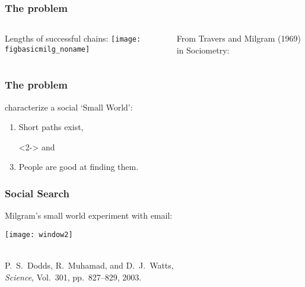 \begin{frame}
   \frametitle{The problem}

   \begin{columns}
     \begin{block}{Lengths of successful chains:}
       \texttt{[image: figbasicmilg\_noname]}
     \end{block}
     From Travers and Milgram (1969) in Sociometry:\cite{travers1969a}\\
   \end{columns}

\end{frame}

\begin{frame}
  \frametitle{The problem}

  \begin{block}{
      characterize a social `Small World':}
    \begin{enumerate}
    \item<2-> Short paths exist, 
    \item[]<2-> and 
    \item<3-> People are good at finding them. 
    \end{enumerate}
  \end{block}

\end{frame}

\begin{frame}
  \frametitle{Social Search}

  \begin{block}{Milgram's small world experiment with email:}
    \begin{center}
      \texttt{[image: window2]}
    \end{center}
  \end{block}

{\small
  \begin{block}{}
  \\
  P.~S.~Dodds, R.~Muhamad, and D.~J.~Watts,\\ 
  \textit{Science}, Vol.~301, pp.~827--829, 2003.\cite{dodds2003b}
  \end{block}
}
\end{frame}

